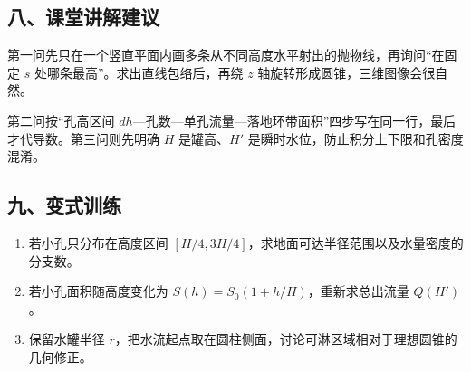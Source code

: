\documentclass[12pt,a4paper,UTF8]{ctexart}
\newcommand{\tightlist}{\setlength{\itemsep}{0pt}\setlength{\parskip}{0pt}}
\begin{document}
\subsection{八、课堂讲解建议}\label{ux516bux8bfeux5802ux8bb2ux89e3ux5efaux8bae-7}

第一问先只在一个竖直平面内画多条从不同高度水平射出的抛物线，再询问``在固定
\(s\) 处哪条最高''。求出直线包络后，再绕 \(z\)
轴旋转形成圆锥，三维图像会很自然。

第二问按``孔高区间
\(dh\)---孔数---单孔流量---落地环带面积''四步写在同一行，最后才代导数。第三问则先明确
\(H\) 是罐高、\(H'\) 是瞬时水位，防止积分上下限和孔密度混淆。

\subsection{九、变式训练}\label{ux4e5dux53d8ux5f0fux8badux7ec3-7}

\begin{enumerate}
\def\labelenumi{\arabic{enumi}.}
\tightlist
\item
  若小孔只分布在高度区间
  \([H/4,3H/4]\)，求地面可达半径范围以及水量密度的分支数。
\item
  若小孔面积随高度变化为 \(S(h)=S_0(1+h/H)\)，重新求总出流量 \(Q(H')\)。
\item
  保留水罐半径
  \(r\)，把水流起点取在圆柱侧面，讨论可淋区域相对于理想圆锥的几何修正。
\end{enumerate}
\end{document}
